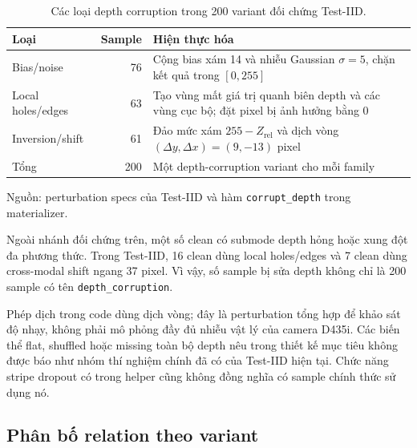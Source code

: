 \begin{table}[htbp]
    \centering
    \setlength{\tabcolsep}{4pt}
    \renewcommand{\arraystretch}{1.15}
    \caption{Các loại depth corruption trong 200 variant đối chứng Test-IID.}
    \label{tab:setup-depth-corruption}
    \small
    \begin{tabularx}{\textwidth}{@{}>{\raggedright\arraybackslash}p{}r>{\raggedright\arraybackslash}X@{}}
        \toprule
        Loại & Sample & Hiện thực hóa \\
        \midrule
        Bias/noise & 76 &
        Cộng bias xám 14 và nhiễu Gaussian $\sigma=5$,
        chặn kết quả trong $[0,255]$ \\
        Local holes/edges & 63 &
        Tạo vùng mất giá trị quanh biên depth và các vùng
        cục bộ; đặt pixel bị ảnh hưởng bằng 0 \\
        Inversion/shift & 61 &
        Đảo mức xám $255-Z_{\mathrm{rel}}$ và dịch vòng
        $(\Delta y,\Delta x)=(9,-13)$ pixel \\
        \midrule
        Tổng & 200 & Một depth-corruption variant cho mỗi family \\
        \bottomrule
    \end{tabularx}
    \vspace{2pt}
    {\footnotesize\raggedright Nguồn: perturbation specs của Test-IID và
    hàm \texttt{corrupt\_\allowbreak depth} trong materializer.\par}
\end{table}

Ngoài nhánh đối chứng trên, một số clean có submode depth
hỏng hoặc xung đột đa phương thức. Trong Test-IID, 16 clean
dùng local holes/edges và 7 clean dùng cross-modal shift
ngang 37 pixel. Vì vậy, số sample bị sửa depth không chỉ
là 200 sample có tên \texttt{depth\_\allowbreak corruption}.

Phép dịch trong code dùng dịch vòng; đây là perturbation
tổng hợp để khảo sát độ nhạy, không phải mô phỏng đầy đủ
nhiễu vật lý của camera D435i. Các biến thể flat, shuffled
hoặc missing toàn bộ depth nêu trong thiết kế mục tiêu
không được báo như nhóm thí nghiệm chính đã có của Test-IID
hiện tại. Chức năng stripe dropout có trong helper cũng
không đồng nghĩa có sample chính thức sử dụng nó.

\subsection{Phân bố relation theo variant}

